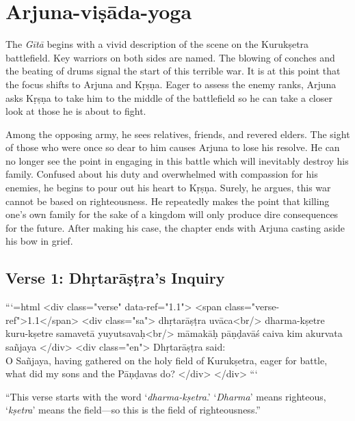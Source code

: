 \chapter{Arjuna-viṣāda-yoga}\label{chap-arjuna-visada-yoga}

\noindent The \textit{Gītā} begins with a vivid description of the scene on the Kurukṣetra battlefield. Key warriors on both sides are named. The blowing of conches and the beating of drums signal the start of this terrible war. It is at this point that the focus shifts to Arjuna and Kṛṣṇa. Eager to assess the enemy ranks, Arjuna asks Kṛṣṇa to take him to the middle of the battlefield so he can take a closer look at those he is about to fight.

Among the opposing army, he sees relatives, friends, and revered elders. The sight of those who were once so dear to him causes Arjuna to lose his resolve. He can no longer see the point in engaging in this battle which will inevitably destroy his family. Confused about his duty and overwhelmed with compassion for his enemies, he begins to pour out his heart to Kṛṣṇa. Surely, he argues, this war cannot be based on righteousness. He repeatedly makes the point that killing one’s own family for the sake of a kingdom will only produce dire consequences for the future. After making his case, the chapter ends with Arjuna casting aside his bow in grief.

\section{Verse 1: Dhṛtarāṣṭra's Inquiry}\label{sec-verse-1-dhrtarastra-s-inquiry}


```{=html}
<div class="verse" data-ref="1.1">
  <span class="verse-ref">1.1</span>
  <div class="sa">
    dhṛtarāṣṭra uvāca<br/>
    dharma-kṣetre kuru-kṣetre samavetā yuyutsavaḥ<br/>
    māmakāḥ pāṇḍavāś caiva kim akurvata sañjaya
  </div>
  <div class="en">
    \hspace*{1em}Dhṛtarāṣṭra said: \\ O Sañjaya, having gathered on the holy field of Kurukṣetra, eager for battle, what did my sons and the Pāṇḍavas do?
  </div>
</div>
```


\enquote{This verse starts with the word \enquote{\textit{dharma-kṣetra}.} \enquote{\textit{Dharma}} means righteous, \enquote{\textit{kṣetra}} means the field---so this is the field of righteousness.}

